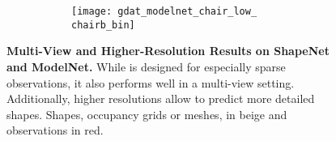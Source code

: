 \begin{figure}[t]
{\begin{subfigure}[t]{0.5\textwidth}
\begin{subfigure}[t]{0.15\textwidth}
    	\end{subfigure}
    	\begin{subfigure}[t]{0.15\textwidth}
    		\vspace{0px}\centering
    		\texttt{[image: gdat\_modelnet\_chair\_low\_\\chairb\_bin]}
    	\end{subfigure}
   	\end{subfigure}
    }
    \vspace*{-\figskipcaption px}
    \caption{{\bf Multi-View and Higher-Resolution Results on ShapeNet and ModelNet.} While \AML is designed for especially sparse observations, it also performs well in a multi-view setting. Additionally, higher resolutions allow to predict more detailed shapes. Shapes, occupancy grids or meshes, in {\color{rbeige}beige} and observations in {\color{rred}red}.}
    \label{fig:results-synthetic-extra}
    \vspace*{-\figskipbelow px}
\end{figure}